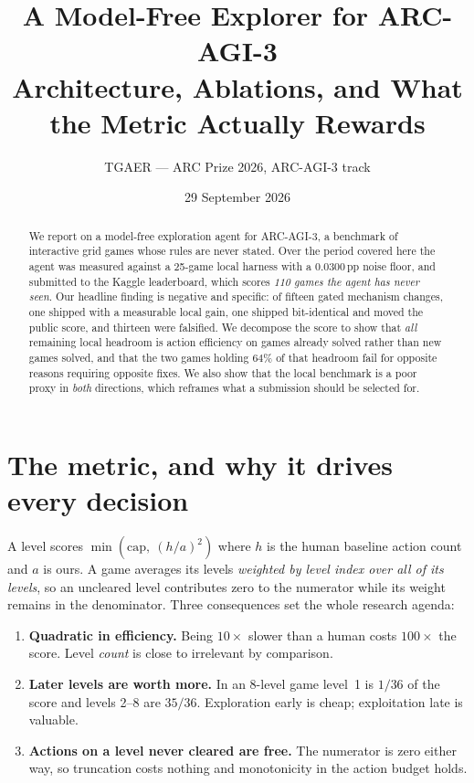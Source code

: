 \documentclass[11pt,a4paper]{article}
\title{\textbf{A Model-Free Explorer for ARC-AGI-3}\\[2pt]
\large Architecture, Ablations, and What the Metric Actually Rewards}
\author{TGAER --- ARC Prize 2026, ARC-AGI-3 track}
\date{29 September 2026}
\newcommand{\pp}{\,\text{pp}}
\begin{document}
\maketitle

\begin{abstract}
\noindent We report on a model-free exploration agent for ARC-AGI-3, a benchmark of
interactive grid games whose rules are never stated. Over the period covered here the
agent was measured against a 25-game local harness with a $0.0300\pp$ noise floor, and
submitted to the Kaggle leaderboard, which scores \emph{110 games the agent has never
seen}. Our headline finding is negative and specific: of fifteen gated mechanism
changes, one shipped with a measurable local gain, one shipped bit-identical and moved
the public score, and thirteen were falsified. We decompose the score to show that
\emph{all} remaining local headroom is action efficiency on games already solved rather
than new games solved, and that the two games holding $64\%$ of that headroom fail for
opposite reasons requiring opposite fixes. We also show that the local benchmark is a
poor proxy in \emph{both} directions, which reframes what a submission should be
selected for.
\end{abstract}

\section{The metric, and why it drives every decision}

A level scores $\min\!\left(\text{cap},\ (h/a)^2\right)$ where $h$ is the human baseline
action count and $a$ is ours. A game averages its levels \emph{weighted by level index
over all of its levels}, so an uncleared level contributes zero to the numerator while
its weight remains in the denominator. Three consequences set the whole research agenda:

\begin{enumerate}\itemsep2pt
  \item \textbf{Quadratic in efficiency.} Being $10\times$ slower than a human costs
  $100\times$ the score. Level \emph{count} is close to irrelevant by comparison.
  \item \textbf{Later levels are worth more.} In an 8-level game level~1 is $1/36$ of
  the score and levels 2--8 are $35/36$. Exploration early is cheap; exploitation late
  is valuable.
  \item \textbf{Actions on a level never cleared are free.} The numerator is zero either
  way, so truncation costs nothing and monotonicity in the action budget holds.
\end{enumerate}
\end{document}
